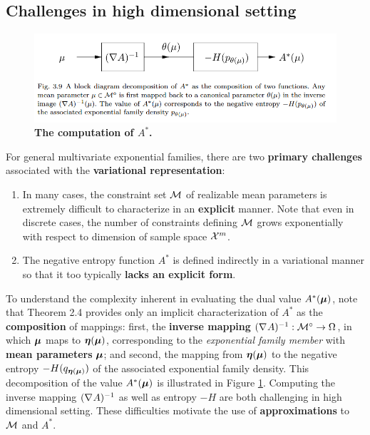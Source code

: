 \documentclass[11pt]{article}
\begin{document}
\subsection{Challenges in high dimensional setting}
\begin{figure}
\begin{minipage}[t]{1\linewidth}
  \centering
  \centerline{\includegraphics[scale = 0.45]{A_dual.png}}
\end{minipage}
\caption{\footnotesize{\textbf{The computation of $A^{*}$.}}}
\label{fig: A_dual}
\end{figure}
For general multivariate exponential families, there are two \textbf{primary challenges} associated with the \textbf{variational representation}:
\begin{enumerate}
\item In many cases, the constraint set ${\mathcal M}$ of realizable mean parameters is extremely difficult to characterize in an \textbf{explicit} manner. Note that even in discrete cases, the number of constraints defining ${\mathcal M}$ grows exponentially with respect to dimension of sample space ${\mathcal X}^{m}$.

\item The negative entropy function $A^{*}$ is defined indirectly in a variational manner so that it too typically \textbf{lacks an explicit form}.
\end{enumerate}

To understand the complexity inherent in evaluating the dual value $A^{*}(\boldsymbol{\mu})$, note that Theorem 2.4 provides only an implicit characterization of $A^{*}$ as the \textbf{composition} of mappings: first, the \textbf{inverse mapping} $(\nabla_{}{A})^{-1}: {\mathcal M}^{\circ} \rightarrow  \Omega$, in which $\boldsymbol{\mu}$ maps to $\boldsymbol{\eta}(\boldsymbol{\mu})$, corresponding to the \emph{exponential family member} with \textbf{mean parameters} $\boldsymbol{\mu}$; and second, the mapping from $\boldsymbol{\eta}(\boldsymbol{\mu})$ to the negative entropy $-H(q_{\boldsymbol{\eta}(\boldsymbol{\mu})})$ of the associated exponential family density. This decomposition of the value $A^{*}(\boldsymbol{\mu})$ is illustrated in Figure \ref{fig: A_dual}. Computing the inverse mapping $(\nabla_{}{A})^{-1}$ as well as entropy $-H$ are both challenging in high dimensional setting. These difficulties motivate the use of \textbf{approximations} to ${\mathcal M}$ and $A^{*}$.
\end{document}
